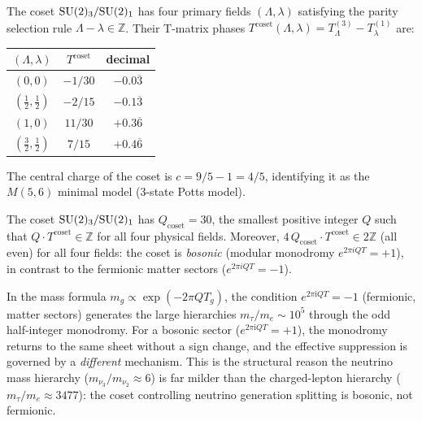\begin{proposition}
\label{P17:prop:coset_T}
The coset $\mathrm{SU}(2)_3/\mathrm{SU}(2)_1$ has four primary fields $(\Lambda,\lambda)$
satisfying the parity selection rule $\Lambda-\lambda\in\mathbb{Z}$.
Their T-matrix phases $T^{\mathrm{coset}}(\Lambda,\lambda)=T^{(3)}_\Lambda - T^{(1)}_\lambda$
are:
\begin{center}
\renewcommand{\arraystretch}{1.35}
\begin{tabular}{ccc}
\toprule
$(\Lambda,\lambda)$ & $T^{\mathrm{coset}}$ & decimal \\
\midrule
$(0,0)$             & $-1/30$  & $-0.0\overline{3}$ \\
$(\tfrac{1}{2},\tfrac{1}{2})$ & $-2/15$ & $-0.1\overline{3}$ \\
$(1,0)$             & $11/30$  & $+0.3\overline{6}$ \\
$(\tfrac{3}{2},\tfrac{1}{2})$ & $7/15$  & $+0.4\overline{6}$ \\
\bottomrule
\end{tabular}
\end{center}
The central charge of the coset is $c=9/5-1=4/5$, identifying it as
the $M(5,6)$ minimal model (3-state Potts model).
\end{proposition}

\begin{theorem}
\label{P17:thm:coset_bosonic}
The coset $\mathrm{SU}(2)_3/\mathrm{SU}(2)_1$ has $Q_{\mathrm{coset}}=30$, the
smallest positive integer $Q$ such that $Q\cdot T^{\mathrm{coset}}\in\mathbb{Z}$
for all four physical fields. Moreover,
$4\,Q_{\mathrm{coset}}\cdot T^{\mathrm{coset}} \in 2\mathbb{Z}$
(all even) for all four fields: the coset is \emph{bosonic}
(modular monodromy $e^{2\pi i QT}=+1$), in contrast to the fermionic
matter sectors ($e^{2\pi i QT}=-1$).
\end{theorem}

\begin{remark}
\label{P17:rem:bosonic_meaning}
In the mass formula $m_g\propto\exp(-2\pi Q T_g)$, the condition
$e^{2\pi\mathrm{i}QT}=-1$ (fermionic, matter sectors) generates
the large hierarchies $m_\tau/m_e\sim10^5$ through the odd
half-integer monodromy.  For a bosonic sector
($e^{2\pi\mathrm{i}QT}=+1$), the monodromy returns to the same
sheet without a sign change, and the effective suppression is
governed by a \emph{different} mechanism.  This is the structural
reason the neutrino mass hierarchy
($m_{\nu_3}/m_{\nu_2}\approx6$) is far milder than the charged-lepton
hierarchy ($m_\tau/m_e\approx3477$): the coset controlling neutrino
generation splitting is bosonic, not fermionic.
\end{remark}

